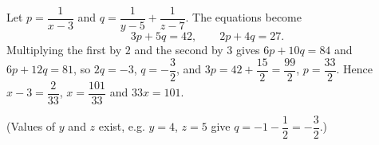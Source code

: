 Let $p=\dfrac{1}{x-3}$ and $q=\dfrac{1}{y-5}+\dfrac{1}{z-7}$. The equations become
\[3p+5q=42,\qquad2p+4q=27.\]
Multiplying the first by $2$ and the second by $3$ gives $6p+10q=84$ and $6p+12q=81$, so $2q=-3$, $q=-\dfrac32$, and $3p=42+\dfrac{15}{2}=\dfrac{99}{2}$, $p=\dfrac{33}{2}$. Hence $x-3=\dfrac{2}{33}$, $x=\dfrac{101}{33}$ and $33x=\boxed{101}$.

(Values of $y$ and $z$ exist, e.g. $y=4$, $z=5$ give $q=-1-\dfrac12=-\dfrac32$.)
